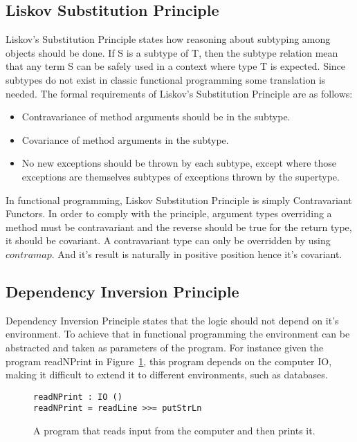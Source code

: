 \subsection{Liskov Substitution Principle}

Liskov's Substitution Principle states how reasoning about subtyping among
objects should be done. If S is a subtype of T, then the subtype relation mean
that any term S can be safely used in a context where type T is expected. Since
subtypes do not exist in classic functional programming some translation is
needed. The formal requirements of Liskov's Substitution Principle are as
follows:

\begin{itemize}
    \item Contravariance of method arguments should be in the subtype.
    \item Covariance of method arguments in the subtype.
    \item No new exceptions should be thrown by each subtype, except where
        those exceptions are themselves subtypes of exceptions thrown by the
        supertype.
\end{itemize}

In functional programming, Liskov Substitution Principle is simply
Contravariant Functors.  In order to comply with the principle, argument types
overriding a method must be contravariant and the reverse should be true for
the return type, it should be covariant.  A contravariant type can only be
overridden by using $contramap$. And it's result is naturally in positive
position hence it's covariant.

\subsection{Dependency Inversion Principle} 

Dependency Inversion Principle states that the logic should not depend on it's
environment. To achieve that in functional programming the environment can
be abstracted and taken as parameters of the program. For instance given the
program readNPrint in Figure~\ref{diexample}, this program depends on the
computer IO, making it difficult to extend it to different environments, such as
databases. 

\begin{figure}[H]
    \begin{lstlisting}
readNPrint : IO () 
readNPrint = readLine >>= putStrLn
    \end{lstlisting}
    \caption{A program that reads input from the computer and then prints it.}
    \label{diexample}
\end{figure}

